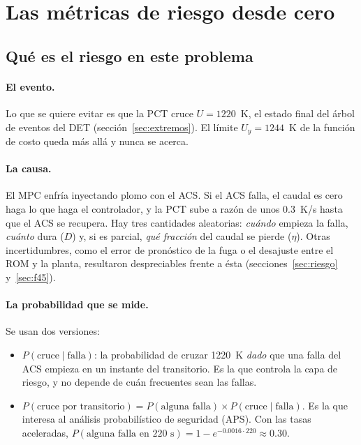\section{Las métricas de riesgo desde cero}\label{sec:riesgo-metricas}

\subsection{Qué es el riesgo en este problema}
\paragraph{El evento.} Lo que se quiere evitar es que la PCT cruce $U=1220$~K, el estado final
del árbol de eventos del DET (sección~\ref{sec:extremos}). El límite $U_y=1244$~K de la función
de costo queda más allá y nunca se acerca.

\paragraph{La causa.} El MPC enfría inyectando plomo con el ACS. Si el ACS falla, el caudal es
cero haga lo que haga el controlador, y la PCT sube a razón de unos 0.3~K/s hasta que el ACS se
recupera. Hay tres cantidades aleatorias: \emph{cuándo} empieza la falla, \emph{cuánto} dura
($D$) y, si es parcial, \emph{qué fracción} del caudal se pierde ($\eta$). Otras
incertidumbres, como el error de pronóstico de la fuga o el desajuste entre el ROM y la planta,
resultaron despreciables frente a ésta (secciones~\ref{sec:riesgo} y~\ref{sec:f45}).

\paragraph{La probabilidad que se mide.} Se usan dos versiones:
\begin{itemize}
  \item $P(\text{cruce}\mid\text{falla})$: la probabilidad de cruzar 1220~K \emph{dado} que una
        falla del ACS empieza en un instante del transitorio. Es la que controla la capa de riesgo,
        y no depende de cuán frecuentes sean las fallas.
  \item $P(\text{cruce por transitorio})=P(\text{alguna falla})\times P(\text{cruce}\mid\text{falla})$.
        Es la que interesa al análisis probabilístico de seguridad (APS). Con las tasas aceleradas,
        $P(\text{alguna falla en 220 s})=1-e^{-0.0016\cdot220}\approx0.30$.
\end{itemize}


